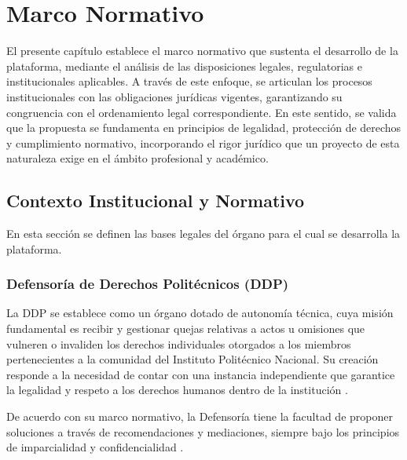 
\chapter{Marco Normativo}
El presente capítulo establece el marco normativo que sustenta el desarrollo de la plataforma, mediante el análisis de las disposiciones legales, regulatorias e institucionales aplicables. A través de este enfoque, se articulan los procesos institucionales con las obligaciones jurídicas vigentes, garantizando su congruencia con el ordenamiento legal correspondiente. En este sentido, se valida que la propuesta se fundamenta en principios de legalidad, protección de derechos y cumplimiento normativo, incorporando el rigor jurídico que un proyecto de esta naturaleza exige en el ámbito profesional y académico.
\begin{flushleft}
\section{Contexto Institucional y Normativo}
\end{flushleft}
\justifying
En esta sección se definen las bases legales del órgano para el cual se desarrolla la plataforma.

\subsection{Defensoría de Derechos Politécnicos (DDP)}
La DDP se establece como un órgano dotado de autonomía técnica, cuya misión fundamental es recibir y gestionar quejas relativas a actos u omisiones que vulneren o invaliden los derechos individuales otorgados a los miembros pertenecientes a la comunidad del Instituto Politécnico Nacional. Su creación responde a la necesidad de contar con una instancia independiente que garantice la legalidad y respeto a los derechos humanos dentro de la institución \cite{3} .

De acuerdo con su marco normativo, la Defensoría tiene la facultad de proponer soluciones a través de recomendaciones y mediaciones, siempre bajo los principios de imparcialidad y confidencialidad \cite{3} .

